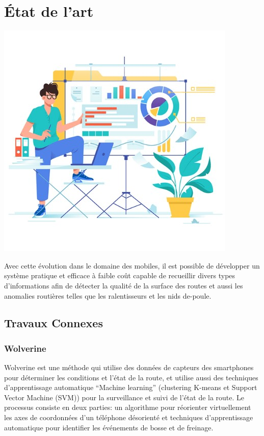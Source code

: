 \chapter{État de l'art}

\label{chapitre3}
		
		\includegraphics [width=1 \linewidth, height=0.8\textheight, keepaspectratio] {Images/chapterFigures/chThree.jpg}
		
	
		
		\newpage

Avec cette évolution dans le domaine des mobiles, il est possible de développer un système pratique et efficace à faible coût capable de recueillir divers types d'informations afin de détecter la qualité de la surface des routes et aussi les anomalies routières telles
que les ralentisseurs et les nids de-poule.

\section{Travaux Connexes}

\subsection{Wolverine}
Wolverine \cite{bhoraskarWolverineTrafficRoad2012} est une méthode qui utilise  des données de capteurs des smartphones pour déterminer les conditions et l'état de la route, et utilise aussi des techniques d'apprentissage automatique “Machine learning” (clustering K-means et Support Vector Machine (SVM)) pour la surveillance et suivi de l'état de la route. Le processus consiste en deux parties: un algorithme pour réorienter virtuellement les axes de coordonnées d'un téléphone désorienté  et techniques d'apprentissage automatique pour identifier les événements de bosse et de freinage.

